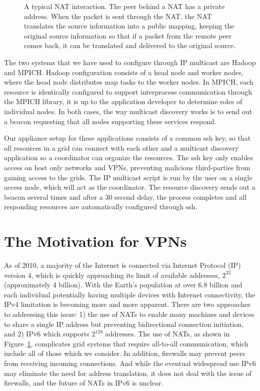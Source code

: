 \documentclass[conference]{IEEEtran}
\begin{document}
\begin{figure}[h!t!]
\centering
{}
\caption{A typical NAT interaction. The peer behind a NAT has a private address.
When the packet is sent through the NAT, the NAT translates the source information
into a public mapping, keeping the original source information so that if a
packet from the remote peer comes back, it can be translated and delivered to
the original source.}
\label{fig:nat}
\end{figure}

The two systems that we have used to configure through IP multicast are Hadoop
and MPICH.  Hadoop configuration consists of a head node and worker nodes,
where the head node distributes map tasks to the worker nodes.  In MPICH, each
resource is identically configured to support interprocess communication
through the MPICH library, it is up to the application developer to determine
roles of individual nodes.  In both cases, the way multicast discovery works is
to send out a beacon requesting that all nodes supporting these services
respond.

Our appliance setup for these applications consists of a common ssh key, so
that all resources in a grid can connect with each other and a multicast
discovery application so a coordinator can organize the resources.  The ssh key
only enables access on host only networks and VPNs, preventing malicious
third-parties from gaining access to the grids.  The IP multicast script is run
by the user on a single access node, which will act as the coordinator.  The
resource discovery sends out a beacon several times and after a 30 second
delay, the process completes and all responding resources are automatically
configured through ssh.

\section{The Motivation for VPNs}
\label{vpns}

As of 2010, a majority of the Internet is connected via Internet Protocol (IP)
version 4, which is quickly approaching its limit of available addresses,
$2^{32}$ (approximately 4 billion).  With the Earth's population at over 6.8
billion and each individual potentially having multiple devices with Internet
connectivity, the IPv4 limitation is becoming more and more apparent.  There
are two approaches to addressing this issue:  1) the use of NATs to enable many
machines and devices to share a single IP address but preventing bidirectional
connection initiation, and 2) IPv6 which supports $2^{128}$ addresses.  The use
of NATs, as shown in Figure~\ref{fig:nat}, complicates grid systems that
require all-to-all communication, which include all of those which we consider.
In addition, firewalls may prevent peers from receiving incoming connections.
And while the eventual widespread use IPv6 may eliminate the need for address
translation, it does not deal with the issue of firewalls, and the future of
NATs in IPv6 is unclear.
\end{document}
